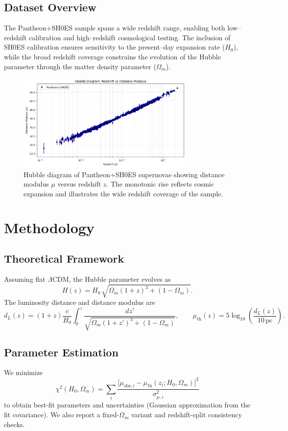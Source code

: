 \documentclass[12pt]{article}
\begin{document}
\subsection{Dataset Overview}
The Pantheon+SH0ES sample spans a wide redshift range, enabling both low–redshift calibration and high–redshift cosmological testing. The inclusion of SH0ES calibration 
ensures sensitivity to the present–day expansion rate ($H_0$), while the broad redshift coverage constrains the evolution of the Hubble parameter through the matter 
density parameter ($\Omega_m$).


\begin{figure}[H]
    \centering
    \includegraphics[width=0.78\textwidth]{hubble_diagram.png}
    \caption{Hubble diagram of Pantheon+SH0ES supernovae showing distance modulus $\mu$ versus redshift $z$. The monotonic rise reflects cosmic expansion and illustrates 
    the wide redshift coverage of the sample.}
    \label{fig:hubble_raw}
\end{figure}
\section{Methodology}
\subsection{Theoretical Framework}
Assuming flat $\Lambda$CDM, the Hubble parameter evolves as
\[
H(z) = H_0 \,\sqrt{\Omega_m(1+z)^3 + (1-\Omega_m)}.
\]
The luminosity distance and distance modulus are
\[
d_L(z) = (1+z)\frac{c}{H_0}\int_0^z \frac{dz'}{\sqrt{\Omega_m(1+z')^3 + (1-\Omega_m)}}, \qquad
\mu_{\mathrm{th}}(z) = 5\log_{10}\!\left(\frac{d_L(z)}{10\,\mathrm{pc}}\right).
\]

\subsection{Parameter Estimation}
We minimize
\[
\chi^2(H_0,\Omega_m) = \sum_i \frac{\big[\mu_{\mathrm{obs},i}-\mu_{\mathrm{th}}(z_i;H_0,\Omega_m)\big]^2}{\sigma_{\mu,i}^2}
\]
to obtain best-fit parameters and uncertainties (Gaussian approximation from the fit covariance). We also report a fixed-$\Omega_m$ variant and redshift-split consistency checks.
\end{document}

